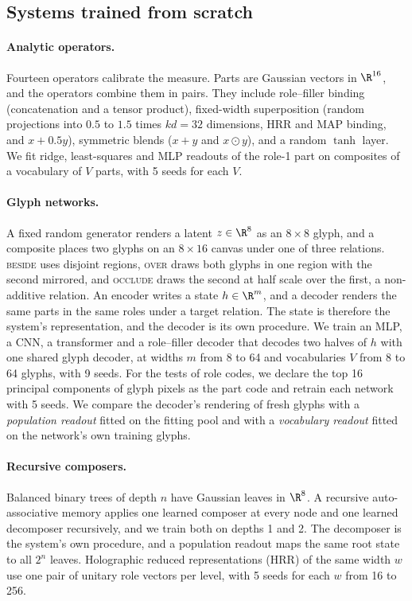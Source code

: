 \subsection{Systems trained from scratch}
\label{sec:design_scratch}

\paragraph{Analytic operators.} Fourteen operators calibrate the measure. Parts are Gaussian vectors in $\R^{16}$, and the operators combine them in pairs. They include role--filler binding (concatenation and a tensor product), fixed-width superposition (random projections into $0.5$ to $1.5$ times $kd = 32$ dimensions, HRR and MAP binding, and $x + 0.5y$), symmetric blends ($x + y$ and $x \odot y$), and a random $\tanh$ layer. We fit ridge, least-squares and MLP readouts of the role-1 part on composites of a vocabulary of $V$ parts, with 5 seeds for each $V$.

\paragraph{Glyph networks.} A fixed random generator renders a latent $z \in \R^{8}$ as an $8 \times 8$ glyph, and a composite places two glyphs on an $8 \times 16$ canvas under one of three relations. \textsc{beside} uses disjoint regions, \textsc{over} draws both glyphs in one region with the second mirrored, and \textsc{occlude} draws the second at half scale over the first, a non-additive relation. An encoder writes a state $h \in \R^m$, and a decoder renders the same parts in the same roles under a target relation. The state is therefore the system's representation, and the decoder is its own procedure. We train an MLP, a CNN, a transformer and a role--filler decoder that decodes two halves of $h$ with one shared glyph decoder, at widths $m$ from 8 to 64 and vocabularies $V$ from 8 to 64 glyphs, with 9 seeds. For the tests of role codes, we declare the top 16 principal components of glyph pixels as the part code and retrain each network with 5 seeds. We compare the decoder's rendering of fresh glyphs with a \emph{population readout} fitted on the fitting pool and with a \emph{vocabulary readout} fitted on the network's own training glyphs.

\paragraph{Recursive composers.} Balanced binary trees of depth $n$ have Gaussian leaves in $\R^8$. A recursive auto-associative memory \citep{pollack1990} applies one learned composer at every node and one learned decomposer recursively, and we train both on depths 1 and 2. The decomposer is the system's own procedure, and a population readout maps the same root state to all $2^n$ leaves. Holographic reduced representations (HRR) of the same width $w$ use one pair of unitary role vectors per level, with 5 seeds for each $w$ from 16 to 256.

